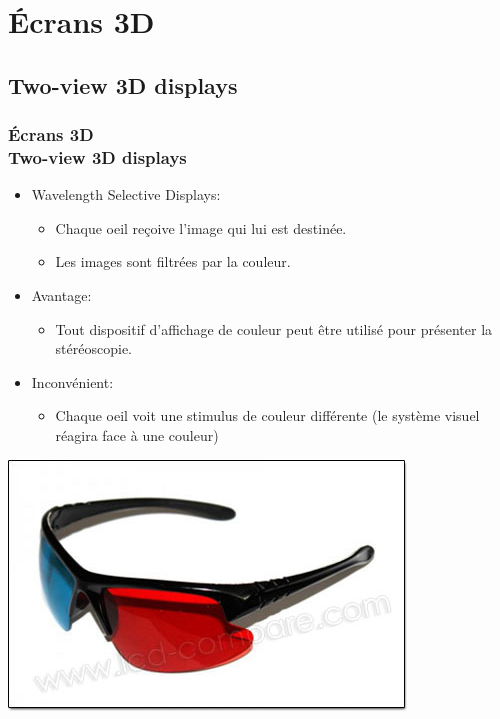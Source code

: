 
	\section{Écrans 3D}
\subsection{Two-view 3D displays}
	\begin{frame}

	  \frametitle{Écrans 3D \\Two-view 3D displays} 
	 
				\begin{itemize}
				\item Wavelength Selective Displays:
				
				\begin{itemize}
				\item Chaque oeil reçoive l'image qui lui est destinée.
				\item Les images sont filtrées par la couleur.			
				\end{itemize}
					
			
			
			\item Avantage:
			\begin{itemize} 	
				\item Tout dispositif d'affichage de couleur peut être utilisé pour présenter la stéréoscopie.
					\end{itemize}
\item Inconvénient:
			\begin{itemize} 
				\item Chaque oeil voit une stimulus de couleur différente (le système visuel réagira face à une couleur)
		\end{itemize}
		\end{itemize}
	\includegraphics[keepaspectratio,height=.2\linewidth]{1.jpg}
	\end{frame}
	
